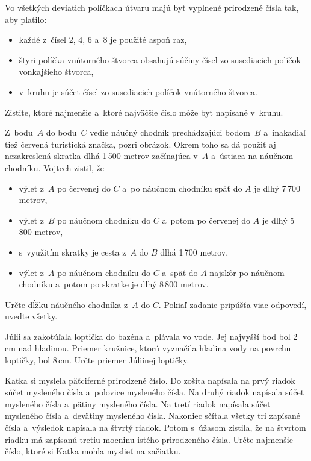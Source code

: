 {%
Vo všetkých deviatich políčkach útvaru majú byť vyplnené prirodzené čísla tak, aby platilo:
\begin{itemize}
\item každé z~čísel 2, 4, 6 a~8 je použité aspoň raz,
\item štyri políčka vnútorného štvorca obsahujú súčiny čísel zo susediacich políčok vonkajšieho štvorca,
\item v~kruhu je súčet čísel zo susediacich políčok vnútorného štvorca.
\end{itemize}
Zistite, ktoré najmenšie a~ktoré najväčšie číslo môže byť napísané v~kruhu.
%
}

{%
Z~bodu~$A$ do bodu~$C$ vedie náučný chodník prechádzajúci bodom~$B$ a~inakadiaľ tiež červená turistická značka, pozri obrázok.
Okrem toho sa dá použiť aj nezakreslená skratka dlhá 1\,500 metrov začínajúca v~$A$ a~ústiaca na náučnom chodníku.
Vojtech zistil, že
\begin{itemize}
\item výlet z~$A$ po červenej do $C$ a~po náučnom chodníku späť do $A$ je dlhý 7\,700 metrov,
\item výlet z~$B$ po náučnom chodníku do $C$ a~potom po červenej do $A$ je dlhý 5\,800 metrov,
\item s~využitím skratky je cesta z~$A$ do $B$ dlhá 1\,700 metrov,
\item výlet z~$A$ po náučnom chodníku do $C$ a~späť do $A$ najskôr po náučnom chodníku a~potom po skratke je dlhý 8\,800 metrov.
\end{itemize}
Určte dĺžku náučného chodníka z~$A$ do $C$.
Pokiaľ zadanie pripúšťa viac odpovedí, uveďte všetky.
%
}

{%
Júlii sa zakotúľala loptička do bazéna a~plávala vo vode.
Jej najvyšší bod bol 2\,cm nad hladinou.
Priemer kružnice, ktorú vyznačila hladina vody na povrchu loptičky, bol 8\,cm.
Určte priemer Júliinej loptičky.
}

{%
Katka si myslela päťciferné prirodzené číslo.
Do zošita napísala na prvý riadok súčet mysleného čísla a~polovice mysleného čísla.
Na druhý riadok napísala súčet mysleného čísla a~pätiny mysleného čísla.
Na tretí riadok napísala súčet mysleného čísla a~devätiny mysleného čísla.
Nakoniec sčítala všetky tri zapísané čísla a~výsledok napísala na štvrtý riadok.
Potom s~úžasom zistila, že na štvrtom riadku má zapísanú tretiu mocninu istého prirodzeného čísla.
Určte najmenšie číslo, ktoré si Katka mohla myslieť na začiatku.
}

